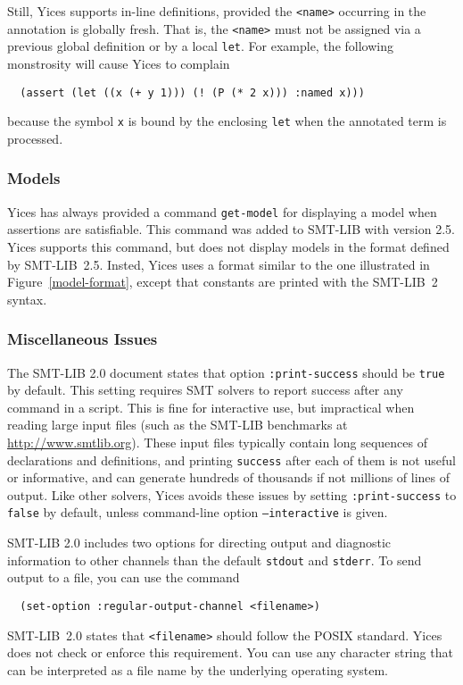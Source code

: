 \documentclass[11pt,twoside,fleqn,openright,titlepage]{cslreport}
\begin{document}
\medskip\noindent Still, Yices supports in-line definitions, provided
the \texttt{<name>} occurring in the annotation is globally fresh. That
is, the \texttt{<name>} must not be assigned via a previous global
definition or by a local \texttt{let}.  For example, the following
monstrosity will cause Yices to complain
\begin{small}
\begin{verbatim}
  (assert (let ((x (+ y 1))) (! (P (* 2 x))) :named x)))
\end{verbatim}
\end{small}
because the symbol \texttt{x} is bound by the enclosing \texttt{let}
when the annotated term is processed.

\subsubsection*{Models}

Yices has always provided a command \texttt{get-model} for displaying
a model when assertions are satisfiable. This command was added to
SMT-LIB with version 2.5. Yices supports this command, but does not
display models in the format defined by SMT-LIB~2.5. Insted, Yices
uses a format similar to the one illustrated in
Figure~\ref{model-format}, except that constants are printed with
the SMT-LIB~2 syntax.


\subsubsection*{Miscellaneous Issues}

The SMT-LIB 2.0 document states that option \texttt{:print-success}
should be \texttt{true} by default. This setting requires SMT solvers
to report success after any command in a script. This is fine for
interactive use, but impractical when reading large input files (such
as the SMT-LIB benchmarks at \url{http://www.smtlib.org}). These
input files typically contain long sequences of declarations and
definitions, and printing \texttt{success} after each of them is not
useful or informative, and can generate hundreds of thousands if not
millions of lines of output.  Like other solvers, Yices avoids these
issues by setting \texttt{:print-success} to \texttt{false} by default,
unless command-line option \texttt{--interactive} is given.


\medskip\noindent SMT-LIB 2.0 includes two options for directing
output and diagnostic information to other channels than the default
\texttt{stdout} and \texttt{stderr}. To send output to a file, you can
use the command
\begin{small}
\begin{verbatim}
  (set-option :regular-output-channel <filename>)
\end{verbatim}
\end{small}
SMT-LIB~2.0 states that \texttt{<filename>} should follow the POSIX
standard. Yices does not check or enforce this requirement. You can
use any character string that can be interpreted as a file name by the
underlying operating system.
\end{document}
